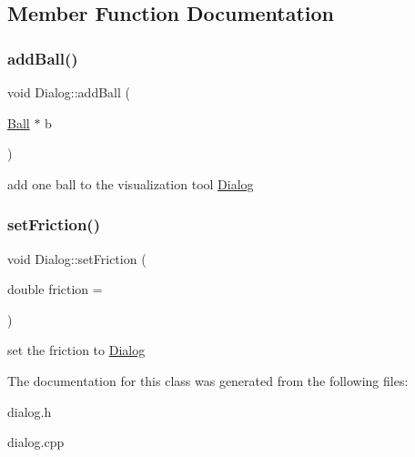 \subsection{Member Function Documentation}
\mbox{\label{class_dialog_a4be1977cc02114a71dd2d43e7e27b6ff}} 
\subsubsection{\texorpdfstring{add\+Ball()}{addBall()}}
{\footnotesize\ttfamily void Dialog\+::add\+Ball (\begin{DoxyParamCaption}\item[{\mbox{\hyperlink{class_ball}{Ball}} $\ast$}]{b }\end{DoxyParamCaption})}

add one ball to the visualization tool \mbox{\hyperlink{class_dialog}{Dialog}} \mbox{\label{class_dialog_a072907acf851676f20f018ee27766ab9}} 
\subsubsection{\texorpdfstring{set\+Friction()}{setFriction()}}
{\footnotesize\ttfamily void Dialog\+::set\+Friction (\begin{DoxyParamCaption}\item[{double}]{friction = {} }\end{DoxyParamCaption})\hspace{0.3cm}{\ttfamily [inline]}}

set the friction to \mbox{\hyperlink{class_dialog}{Dialog}} 

The documentation for this class was generated from the following files\+:\begin{DoxyCompactItemize}
\item 
dialog.\+h\item 
dialog.\+cpp\end{DoxyCompactItemize}
